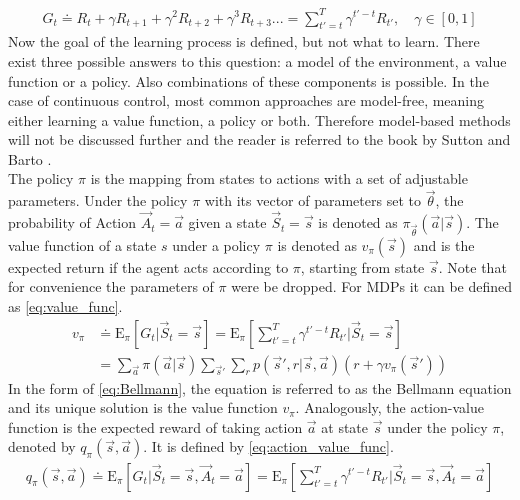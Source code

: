 \begin{align}
	G_t \doteq R_t + \gamma R_{t+1} + \gamma^2 R_{t+2} + \gamma^3 R_{t+3}... = \sum_{t'=t}^{T}\gamma^{t'-t} R_{t'},\quad \gamma \in [0, 1] \label{eq:return}
\end{align}
Now the goal of the learning process is defined, but not what to learn. There exist three possible answers to this question: a model of the environment, a value function or a policy. Also combinations of these components is possible. In the case of continuous control, most common approaches are model-free, meaning either learning a value function, a policy or both. Therefore model-based methods will not be discussed further and the reader is referred to the book by Sutton and Barto \cite{sutton_reinforcement_2018}. \\
The policy $\pi$ is the mapping from states to actions with a set of adjustable parameters. Under the policy $\pi$ with its vector of parameters set to $\vec{\theta}$, the probability of Action $\vec{A}_t=\vec{a}$ given a state $\vec{S}_t=\vec{s}$ is denoted as $\pi_{\vec{\theta}}(\vec{a}|\vec{s})$. The value function of a state $s$ under a policy $\pi$ is denoted as $v_{\pi}(\vec{s})$ and is the expected return if the agent acts according to $\pi$, starting from state $\vec{s}$. Note that for convenience the parameters of $\pi$ were be dropped. For MDPs it can be defined as \eqref{eq:value_func}. 
\begin{align}
	v_{\pi} &\doteq \mathrm{E}_\pi \left[ G_t \vert \vec{S}_t= \vec{s} \right] =
	\mathrm{E}_\pi \left[\sum_{t'=t}^{T}\gamma^{t'-t} R_{t'} \vert \vec{S}_t=\vec{s}\right] \label{eq:value_func} \\
	&= \sum_{\vec{a}} \pi(\vec{a} \vert \vec{s}) 
	\sum_{\vec{s}'} \sum_{r} p(\vec{s}',r \vert \vec{s},\vec{a}) \left( r + \gamma v_\pi(\vec{s}') \right) \label{eq:Bellmann}
\end{align}
In the form of \eqref{eq:Bellmann}, the equation is referred to as the Bellmann equation and its unique solution is the value function $v_\pi$. Analogously, the action-value function is the expected reward of taking action $\vec{a}$ at state $\vec{s}$ under the policy $\pi$, denoted by $q_\pi(\vec{s},\vec{a})$. It is defined by \eqref{eq:action_value_func}. \cite[p. 58-59]{sutton_reinforcement_2018}
\begin{align}
	q_\pi(\vec{s},\vec{a}) \doteq \mathrm{E}_\pi \left[ G_t \vert \vec{S}_t=\vec{s}, \vec{A}_t=\vec{a} \right] =
	\mathrm{E}_\pi \left[\sum_{t'=t}^{T}\gamma^{t'-t} R_{t'} \vert \vec{S}_t=\vec{s}, \vec{A}_t=\vec{a}\right] \label{eq:action_value_func} 
\end{align}
